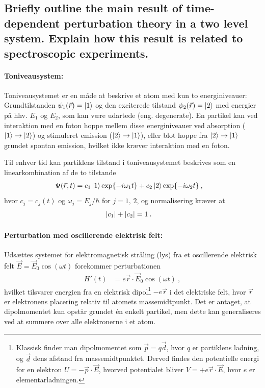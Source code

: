 \subsection{Briefly outline the main result of time-dependent perturbation theory in a two level system. Explain how this result is related to spectroscopic experiments.}


\paragraph{Toniveausystem:} Toniveausystemet er en måde at beskrive et atom med kun to energiniveauer: Grundtilstanden $\psi_1(\Vec{r}) = \ket{1}$ og den exciterede tilstand $\psi_2(\Vec{r}) = \ket{2}$ med energier på hhv. $E_1$ og $E_2$, som kan være udartede (eng. degenerate). En partikel kan ved interaktion med en foton hoppe mellem disse energiniveauer ved absorption ($\ket{1} \rightarrow \ket{2}$) og stimuleret emission ($\ket{2} \rightarrow \ket{1}$), eller blot hoppe fra $\ket{2} \rightarrow \ket{1}$ grundet spontan emission, hvilket ikke kræver interaktion med en foton.

Til enhver tid kan  partiklens tilstand i toniveausystemet beskrives som en linearkombination af de to tilstande
\begin{align} \label{eq:Q03_TotalBoelgefunktionTidsafhaengig}
    \Psi(\Vec{r},t) &= c_1\ket{1}\exp{-i\omega_1 t} + c_2\ket{2}\exp{-i\omega_2 t} \: ,
\end{align}
hvor $c_j = c_j(t)$ og $\omega_j = E_j/\hbar$ for $j = 1,\,2$, og normalisering kræver at
\begin{align}
    \abs{c_1} + \abs{c_2} &= 1 \: .
\end{align}


\paragraph{Perturbation med oscillerende elektrisk felt:} Udsættes systemet for elektromagnetisk stråling (lys) fra et oscillerende elektrisk felt $\Vec{E} = \Vec{E}_0\cos(\omega t)$ forekommer perturbationen
\begin{align}
    H'(t) &= e\Vec{r} \cdot \Vec{E}_0 \cos(\omega t) \: ,
\end{align}
hvilket tilsvarer energien fra en elektrisk dipol\footnote{Klassisk finder man dipolmomentet som $\Vec{p} = q\Vec{d}$, hvor $q$ er partiklens ladning, og $\Vec{d}$ dens afstand fra massemidtpunktet. Derved findes den potentielle energi for en elektron $U = -\Vec{p}\cdot\Vec{E}$, hvorved potentialet bliver $V = +e\Vec{r}\cdot\Vec{E}$, hvor $e$ er elementarladningen.} $-e\Vec{r}$ i det elektriske felt, hvor $\Vec{r}$ er elektronens placering relativ til atomets massemidtpunkt. Det er antaget, at dipolmomentet kun opstår grundet én enkelt partikel, men dette kan generaliseres ved at summere over alle elektronerne i et atom.

